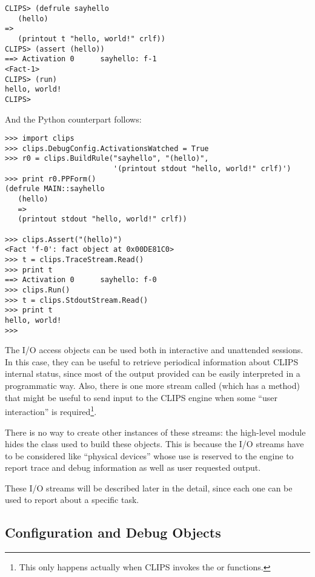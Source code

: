 \begin{verbatim}
CLIPS> (defrule sayhello
   (hello)
=>
   (printout t "hello, world!" crlf))
CLIPS> (assert (hello))
==> Activation 0      sayhello: f-1
<Fact-1>
CLIPS> (run)
hello, world!
CLIPS>
\end{verbatim}

And the Python counterpart follows:

\begin{verbatim}
>>> import clips
>>> clips.DebugConfig.ActivationsWatched = True
>>> r0 = clips.BuildRule("sayhello", "(hello)",
                         '(printout stdout "hello, world!" crlf)')
>>> print r0.PPForm()
(defrule MAIN::sayhello
   (hello)
   =>
   (printout stdout "hello, world!" crlf))

>>> clips.Assert("(hello)")
<Fact 'f-0': fact object at 0x00DE81C0>
>>> t = clips.TraceStream.Read()
>>> print t
==> Activation 0      sayhello: f-0
>>> clips.Run()
>>> t = clips.StdoutStream.Read()
>>> print t
hello, world!
>>>
\end{verbatim}

The I/O access objects can be used both in interactive and unattended
sessions. In this case, they can be useful to retrieve periodical
information about CLIPS internal status, since most of the output
provided can be easily interpreted in a programmatic way. Also, there
is one more stream called  (which has a
 method) that might be useful to send input to the
CLIPS engine when some ``user interaction'' is required\footnote{This only
happens actually when CLIPS invokes the  or 
functions.}.

There is no way to create other instances of these streams: the
high-level module hides the class used to build these objects. This
is because the I/O streams have to be considered like ``physical
devices'' whose use is reserved to the engine to report trace and
debug information as well as user requested output.

These I/O streams will be described later in the detail, since each
one can be used to report about a specific task.



\subsection{Configuration and Debug Objects\label{pyclips-ov-cado}}

